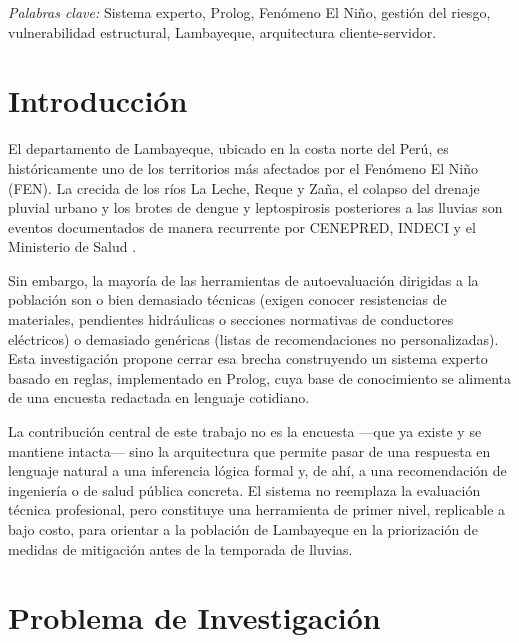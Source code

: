 \documentclass[12pt, letterpaper]{article}
\begin{document}
\vspace{1cm}
\noindent\hspace{0.5in}\textit{Palabras clave:} Sistema experto, Prolog, Fenómeno El Niño, gestión del riesgo, vulnerabilidad estructural, Lambayeque, arquitectura cliente-servidor.

\newpage
\tableofcontents
\newpage
\listoffigures
\listoftables
\thispagestyle{fancy}

\newpage
\section{Introducción}

El departamento de Lambayeque, ubicado en la costa norte del Perú, es históricamente uno de los territorios más afectados por el Fenómeno El Niño (FEN). La crecida de los ríos La Leche, Reque y Zaña, el colapso del drenaje pluvial urbano y los brotes de dengue y leptospirosis posteriores a las lluvias son eventos documentados de manera recurrente por CENEPRED, INDECI y el Ministerio de Salud \parencite{gob_regional_lambayeque_2023, cenepred_manual_evar, minsa_alerta_2023}.

Sin embargo, la mayoría de las herramientas de autoevaluación dirigidas a la población son o bien demasiado técnicas (exigen conocer resistencias de materiales, pendientes hidráulicas o secciones normativas de conductores eléctricos) o demasiado genéricas (listas de recomendaciones no personalizadas). Esta investigación propone cerrar esa brecha construyendo un sistema experto basado en reglas, implementado en Prolog, cuya base de conocimiento se alimenta de una encuesta redactada en lenguaje cotidiano.

La contribución central de este trabajo no es la encuesta —que ya existe y se mantiene intacta— sino la arquitectura que permite pasar de una respuesta en lenguaje natural a una inferencia lógica formal y, de ahí, a una recomendación de ingeniería o de salud pública concreta. El sistema no reemplaza la evaluación técnica profesional, pero constituye una herramienta de primer nivel, replicable a bajo costo, para orientar a la población de Lambayeque en la priorización de medidas de mitigación antes de la temporada de lluvias.

\section{Problema de Investigación}
\end{document}
